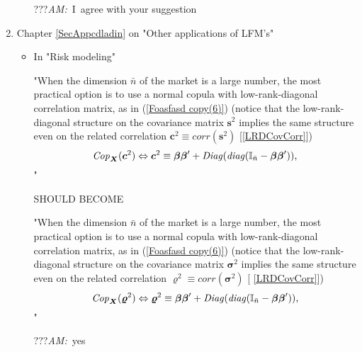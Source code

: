\documentclass{article}
\begin{document}
\begin{enumerate}
\begin{itemize}
???\textsl{AM:}\ I\ agree with your suggestion
\end{itemize}

\item Chapter \ref{SecAppcdladin} on "Other applications of LFM's"

\begin{itemize}
\item In "Risk modeling"

"When the dimension $\bar{n}$ of the market is a large number, the most
practical option is to use a normal copula with low-rank-diagonal
correlation matrix, as in (\ref{Foasfasd copy(6)}) (notice that the
low-rank-diagonal structure on the covariance matrix $\boldsymbol{s}^{2}$
implies the same structure even on the related correlation $\boldsymbol{c}%
^{2}\equiv \mathit{corr}(\boldsymbol{s}^{2})$ [\ref{LRDCovCorr}])%
\begin{equation}
\mathit{Cop}_{\boldsymbol{X}}(\boldsymbol{c}^{2})\Leftrightarrow \boldsymbol{%
c}^{2}\equiv \boldsymbol{\beta \beta }^{\prime }+\mathit{Diag}(\mathit{diag}(%
\mathbb{I}_{\bar{n}}-\boldsymbol{\beta \beta }^{\prime }))\text{,}
\end{equation}%
"

SHOULD BECOME

"When the dimension $\bar{n}$ of the market is a large number, the most
practical option is to use a normal copula with low-rank-diagonal
correlation matrix, as in (\ref{Foasfasd copy(6)}) (notice that the
low-rank-diagonal structure on the covariance matrix $\boldsymbol{\sigma }%
^{2}$ implies the same structure even on the related correlation $%
\boldsymbol{\varrho }^{2}\equiv \mathit{corr}(\boldsymbol{\sigma }^{2})$ [%
\ref{LRDCovCorr}])%
\begin{equation}
\mathit{Cop}_{\boldsymbol{X}}(\boldsymbol{\varrho }^{2})\Leftrightarrow 
\boldsymbol{\varrho }^{2}\equiv \boldsymbol{\beta \beta }^{\prime }+\mathit{%
Diag}(\mathit{diag}(\mathbb{I}_{\bar{n}}-\boldsymbol{\beta \beta }^{\prime
}))\text{,}  \label{asbdasdas}
\end{equation}%
"

???\textsl{AM:}\ yes
\end{itemize}
\end{enumerate}
\end{document}
